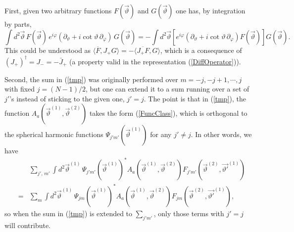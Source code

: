 \documentclass[a4paper,12pt]{article}
\begin{document}
{First, given two arbitrary functions $F(\vec{\vartheta})$ and $G(\vec{\vartheta})$ one has, by integration by parts,
\begin{equation}
\int d^{2}\vec{\vartheta}\,F(\vec{\vartheta})\,e^{i\varphi}(\partial_{\vartheta}+i\cot \vartheta\,\partial_{\varphi})\,G(\vec{\vartheta})=-\int d^{2}\vec{\vartheta}\left[e^{i\varphi}(\partial_{\vartheta}+i\cot \vartheta\,\partial_{\varphi})F(\vec{\vartheta})\right]G(\vec{\vartheta}).
\label{tmp1}
\end{equation}
This could be understood as $\langle \overline{F},J_{+}G\rangle=-\langle \overline{J_{+}F},G\rangle$, which is a consequence of $(J_{+})^{\dag}=J_{-}=-\bar{J}_{+}$ (a property valid in the representation (\ref{DiffOperator})).

Second, the sum in (\ref{tmp}) was originally performed over $m=-j,-j+1,\cdots,j$ with fixed $j=(N-1)/2$, but one can extend it to a sum running over a set of
$j'$'s instead of sticking to the given one, $j' = j$. The point is that in (\ref{tmp}), the function $A_{a}(\vec{\vartheta}^{(1)},\vec{\vartheta}^{(2)})$ takes the form (\ref{FuncClass}), which is orthogonal to the spherical harmonic functions $\Psi_{j'm'}(\vec{\vartheta}^{(1)})$ for any $j'\neq j$. In other words, we have
\begin{eqnarray}
& & \sum_{j',\,m'}\int d^{2}\vec{\vartheta}^{(1)}\,\Psi_{j'm'}(\vec{\vartheta}^{(1)})^{*}A_{a}(\vec{\vartheta}^{(1)},\vec{\vartheta}^{(2)})F_{j'm'}(\vec{\vartheta}^{(2)},\vec{\vartheta'}^{(1)})\nonumber\\
&=&\sum_{m}\int d^{2}\vec{\vartheta}^{(1)}\,\Psi_{jm}(\vec{\vartheta}^{(1)})^{*}A_{a}(\vec{\vartheta}^{(1)},\vec{\vartheta}^{(2)})F_{jm}(\vec{\vartheta}^{(2)},\vec{\vartheta'}^{(1)}),
\label{tmp2}
\end{eqnarray}
so when the sum in (\ref{tmp}) is extended to $\sum_{j'm'}$, only those terms with $j'=j$ will contribute.

}
\end{document}
